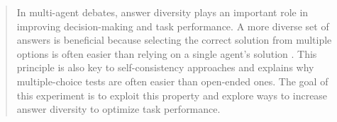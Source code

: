\documentclass[11pt]{article}
\begin{document}
\begin{abstract}
 
\begin{table}[t]
\centering
{}
\caption{Final answer similarity based on average cosine similarity between SBERT embeddings of final answers compared to task performance on StrategyQA dataset.}
\label{tab:embed-strategies-transposed}
\end{table}

In multi-agent debates, answer diversity plays an important role in improving decision-making and task performance.
A more diverse set of answers is beneficial because selecting the correct solution from multiple options is often easier than relying on a single agent's solution \citep{zheng_judging_2023}. 
This principle is also key to self-consistency approaches \citep{wang_self-consistency_2022} and explains why multiple-choice tests are often easier than open-ended ones. 
The goal of this experiment is to exploit this property and explore ways to increase answer diversity to optimize task performance.


\end{abstract}
\end{document}
